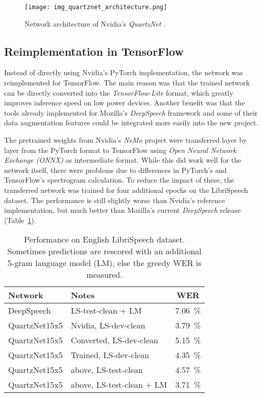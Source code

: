 \begin{figure}[htb]
	\centering
	\texttt{[image: img\_quartznet\_architecture.png]}
	\caption{Network architecture of Nvidia's \textit{QuartzNet} \cite{QNET}.}
	\label{fig:qn}
\end{figure}

\subsection{Reimplementation in TensorFlow}

Instead of directly using Nvidia's PyTorch implementation, the network was reimplemented for TensorFlow. The main reason was that the trained network can be directly converted into the \textit{TensorFlow-Lite} format, which greatly improves inference speed on low power devices. Another benefit was that the tools already implemented for Mozilla's \textit{DeepSpeech} framework and some of their data augmentation features could be integrated more easily into the new project.

The pretrained weights from Nvidia's \textit{NeMo} project were transferred layer by layer from the PyTorch format to TensorFlow using \textit{Open Neural Network Exchange (ONNX)} as intermediate format.
While this did work well for the network itself, there were problems due to differences in PyTorch's and TensorFlow's spectrogram calculation. To reduce the impact of these, the transferred network was trained for four additional epochs on the LibriSpeech dataset. The performance is still slightly worse than Nvidia's reference implementation, but much better than Mozilla's current \textit{DeepSpeech} release (Table~\ref{tab:qen}).

\begin{table}[H]
	\caption{Performance on English LibriSpeech dataset. Sometimes predictions are rescored with an additional 5-gram language model (LM), else the greedy WER is measured.}
	\label{tab:qen}
	\centering
	\begin{tabular}{llc}
		\toprule
		\textbf{Network} & \textbf{Notes} & \textbf{WER} \\
		\midrule
		DeepSpeech & LS-test-clean + LM & \SI{7.06}{\percent} \\
		\midrule
		QuartzNet15x5 & Nvidia, LS-dev-clean & \SI{3.79}{\percent} \\
		QuartzNet15x5 & Converted, LS-dev-clean & \SI{5.15}{\percent} \\
		QuartzNet15x5 & Trained, LS-dev-clean & \SI{4.35}{\percent} \\
		QuartzNet15x5 & above, LS-test-clean & \SI{4.57}{\percent} \\
		QuartzNet15x5 & above, LS-test-clean + LM & \SI{3.71}{\percent} \\
		\bottomrule
	\end{tabular}
\end{table}

